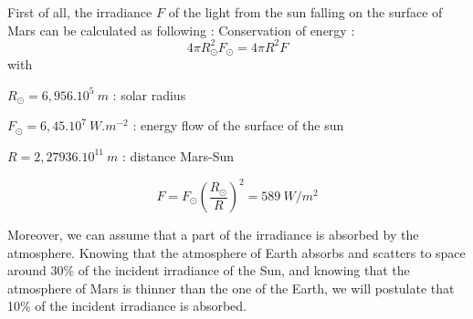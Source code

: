 First of all, the irradiance $F$ of the light from the sun falling on the surface of Mars can be calculated as following :
Conservation of energy :
\begin{equation}
\label{eq:conservation of energy}
4\pi R_\odot^2F_\odot=4\pi R^2F
\end{equation}
with 

$R_\odot=6,956.10^5\ m$ : solar radius

$F_\odot=6,45.10^7\ W.m^{-2}$ : energy flow of the surface of the sun

$R = 2,27936.10^11 \ m$ : distance Mars-Sun

\begin{equation}
\label{eq:Irradiance Sun}
F = F_\odot \left(\frac{R_\odot}{R}\right)^2 = 589 \ W/m^2
\end{equation}

Moreover, we can assume that a part of the irradiance is absorbed by the atmosphere. Knowing that the atmosphere of Earth absorbs and scatters to space around 30\% of the incident irradiance of the Sun, and knowing  that the atmosphere of Mars is thinner than the one of the Earth, we will postulate that 10\% of the incident irradiance is absorbed.
